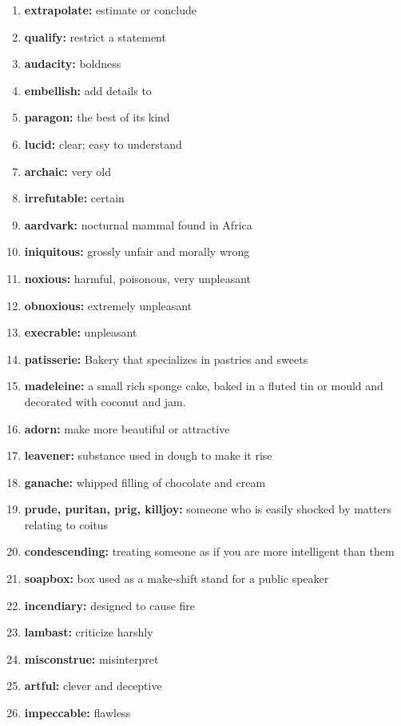 \documentclass{article}
\begin{document}
\begin{enumerate}
    \item \textbf{extrapolate: }{estimate or conclude}
    \item \textbf{qualify: }{restrict a statement}
    \item \textbf{audacity: }{boldness}
    \item \textbf{embellish: }{add details to}
    \item \textbf{paragon: }{the best of its kind}
    \item \textbf{lucid: }{clear; easy to understand}
    \item \textbf{archaic: }{very old}
    \item \textbf{irrefutable: }{certain}
    \item \textbf{aardvark: }{nocturnal mammal found in Africa}
    \item \textbf{iniquitous: }{grossly unfair and morally wrong}
    \item \textbf{noxious: }{harmful, poisonous, very unpleasant}
    \item \textbf{obnoxious: }{extremely unpleasant}
    \item \textbf{execrable: }{unpleasant}
    \item \textbf{patisserie: }{Bakery that specializes in pastries and sweets}
    \item \textbf{madeleine: }{a small rich sponge cake, baked in a fluted tin or mould and decorated with coconut and jam.}
    \item \textbf{adorn: }{make more beautiful or attractive}
    \item \textbf{leavener: }{substance used in dough to make it rise}
    \item \textbf{ganache: }{whipped filling of chocolate and cream}
    \item \textbf{prude, puritan, prig, killjoy: }{someone who is easily shocked by matters relating to coitus}
    \item \textbf{condescending: }{treating someone as if you are more intelligent than them}
    \item \textbf{soapbox: }{box used as a make-shift stand for a public speaker}
    \item \textbf{incendiary: }{designed to cause fire}
    \item \textbf{lambast: }{criticize harshly}
    \item \textbf{misconstrue: }{misinterpret}
    \item \textbf{artful: }{clever and deceptive}
    \item \textbf{impeccable: }{flawless}

\end{enumerate}
\end{document}
